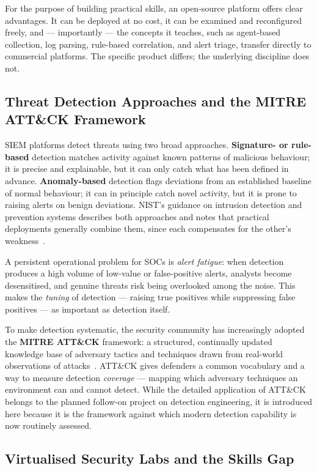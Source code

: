 For the purpose of building practical skills, an open-source platform offers
clear advantages. It can be deployed at no cost, it can be examined and
reconfigured freely, and --- importantly --- the concepts it teaches, such as
agent-based collection, log parsing, rule-based correlation, and alert triage,
transfer directly to commercial platforms. The specific product differs; the
underlying discipline does not.

\subsection{Threat Detection Approaches and the MITRE ATT\&CK Framework}

SIEM platforms detect threats using two broad approaches.
\textbf{Signature- or rule-based} detection matches activity against known
patterns of malicious behaviour; it is precise and explainable, but it can
only catch what has been defined in advance. \textbf{Anomaly-based} detection
flags deviations from an established baseline of normal behaviour; it can in
principle catch novel activity, but it is prone to raising alerts on benign
deviations. NIST's guidance on intrusion detection and prevention systems
describes both approaches and notes that practical deployments generally
combine them, since each compensates for the other's
weakness~\cite{nist80094}.

A persistent operational problem for SOCs is \textit{alert fatigue}: when
detection produces a high volume of low-value or false-positive alerts,
analysts become desensitised, and genuine threats risk being overlooked among
the noise. This makes the \textit{tuning} of detection --- raising true
positives while suppressing false positives --- as important as detection
itself.

To make detection systematic, the security community has increasingly adopted
the \textbf{MITRE ATT\&CK} framework: a structured, continually updated
knowledge base of adversary tactics and techniques drawn from real-world
observations of attacks~\cite{mitreattack}. ATT\&CK gives defenders a common
vocabulary and a way to measure detection \textit{coverage} --- mapping which
adversary techniques an environment can and cannot detect. While the detailed
application of ATT\&CK belongs to the planned follow-on project on detection
engineering, it is introduced here because it is the framework against which
modern detection capability is now routinely assessed.

\subsection{Virtualised Security Labs and the Skills Gap}

